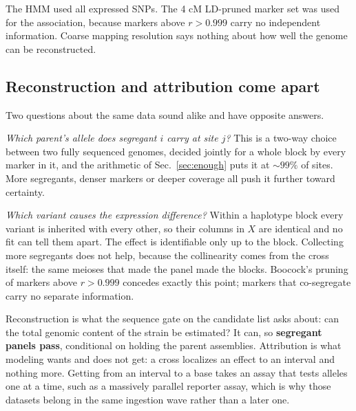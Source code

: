  The HMM used
all expressed SNPs. The 4 cM LD-pruned marker set was used for the association, because
markers above $r>0.999$ carry no independent information. Coarse mapping resolution says
nothing about how well the genome can be reconstructed.

\subsection{Reconstruction and attribution come apart}\label{sec:verdict}

Two questions about the same data sound alike and have opposite answers.

 \emph{Which parent's allele does segregant $i$ carry at
site $j$?} This is a two-way choice between two fully sequenced genomes, decided jointly
for a whole block by every marker in it, and the arithmetic of
Sec.~\ref{sec:enough} puts it at $\sim\!99\%$ of sites. More segregants, denser markers or
deeper coverage all push it further toward certainty.

 \emph{Which variant causes the expression difference?}
Within a haplotype block every variant is inherited with every other, so their columns in
$X$ are identical and no fit can tell them apart. The effect is identifiable only up to
the block. Collecting more segregants does not help, because the collinearity comes from
the cross itself: the same meioses that made the panel made the blocks. Boocock's pruning
of markers above $r>0.999$ concedes exactly this point; markers that co-segregate carry no
separate information.

 Reconstruction is what the sequence gate on the
candidate list asks about: can the total genomic content of the strain be estimated? It
can, so \textbf{segregant panels pass}, conditional on holding the parent assemblies.
Attribution is what modeling wants and does not get: a cross localizes an effect to an
interval and nothing more. Getting from an interval to a base takes an assay that tests
alleles one at a time, such as a massively parallel reporter assay, which is why those
datasets belong in the same ingestion wave rather than a later one.
